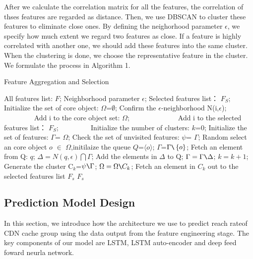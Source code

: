 \documentclass[5p]{elsarticle}
\newcommand{\dabiaolv}{reach rate}
\begin{document}
After we calculate the correlation matrix for all the features, the correlation of thses features are regarded as distance. Then, we use DBSCAN to cluster these features to eliminate close ones. By defining the neighorhood parameter $\epsilon$, we specify how much extent we regard two features as close. If a feature is highly correlated with another one, we should add these features into the same cluster. When the clustering is done, we choose the representative feature in the cluster. We formulate the process in Algorithm 1.

\begin{algorithm}[t]
\caption{Feature Aggregation and Selection} 
\begin{algorithmic}[1]
\Require  
    All features list: $F$;
    Neighborhood parameter $\epsilon$; 
\Ensure  
    Selected features list： $F_S$;  
\State Initialize the set of core object:  $\Omega$=$\emptyset$;
    \State Confirm the $\epsilon$-neighborhood\; N(i,$\epsilon$);
　　　　        \State Add i to the core object set: $\Omega$;
　　        \Else
　　　　        \State Add i to the selected features list： $F_S$;
　　　　    \EndIf
\EndFor
\State Initialize the number of clusters:  $k$=0;
\State Initialize the set of features:  $\Gamma$= $\Omega$;
\While{$\Omega\neq\emptyset$}
\State Check the set of unvisited features: $\psi$= $\Gamma$;
    \State Random select an core object $o$ $\in$ $\Omega$,initilaize the queue $Q$=$\langle o \rangle$;
\State $\Gamma$=$\Gamma \verb|\|\left\{o\right\}$;
    \State Fetch an element from Q: $q$;
    \State $\Delta=N(q,\epsilon)\bigcap\Gamma$;
    \State Add the elements in $\Delta$ to Q;
    \State  $\Gamma= \Gamma\verb|\|\Delta$;
\EndWhile
\State $k=k+1$;
\State Generate the cluster C$_k$=$\psi\verb|\|\Gamma$;
\State $\Omega=\Omega\verb|\|C_k$;
\EndWhile
{}
    \State Fetch an element in $C_k$ out to the selected features list $F_s$
\EndFor
\State \Return $F_s$
\end{algorithmic}
\end{algorithm}


\subsection{Prediction Model Design}

In this section, we introduce how the architecture we use to predict \dabiaolv of CDN cache group using the data output from the feature engineering stage. The key components of our model are LSTM, LSTM auto-encoder and deep feed foward neurla network.
\end{document}

